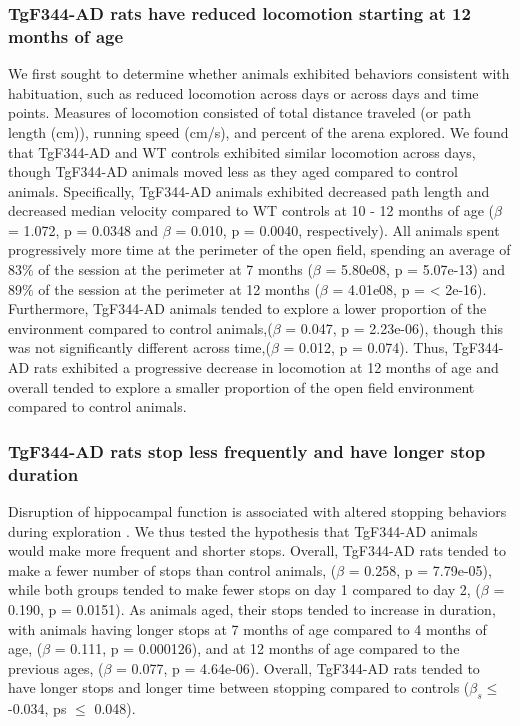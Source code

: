 \documentclass[fleqn,10pt]{wlscirep}
\begin{document}
\subsubsection*{TgF344-AD rats have reduced locomotion starting at 12 months of age}
We first sought to determine whether animals exhibited behaviors consistent with habituation, such as reduced locomotion across days or across days and time points. Measures of locomotion consisted of total distance traveled (or path length (cm)), running speed (cm/s), and percent of the arena explored. We found that TgF344-AD and WT controls exhibited similar locomotion across days, though TgF344-AD animals moved less as they aged compared to control animals. Specifically, TgF344-AD animals exhibited decreased path length and decreased median velocity compared to WT controls at 10 - 12 months of age ($\beta$ = 1.072, p =  0.0348 and $\beta$ = 0.010, p = 0.0040, respectively). All animals spent progressively more time at the perimeter of the open field, spending an average of 83$\%$ of the session at the perimeter at 7 months ($\beta$ = 5.80e08, p = 5.07e-13)  and 89$\%$ of the session at the perimeter at 12 months ($\beta$ = 4.01e08, p = < 2e-16). Furthermore, TgF344-AD animals tended to explore a lower proportion of the environment compared to control animals,($\beta$ = 0.047, p = 2.23e-06), though this was not significantly different across time,($\beta$ = 0.012, p = 0.074). Thus, TgF344-AD rats exhibited a progressive decrease in locomotion at 12 months of age and overall tended to explore a smaller proportion of the open field environment compared to control animals. 

\subsubsection*{TgF344-AD rats stop less frequently and have longer stop duration}   
Disruption of hippocampal function is associated with altered stopping behaviors during exploration \cite{martin_medial_2007}. We thus tested the hypothesis that TgF344-AD animals would make more frequent and shorter stops. Overall, TgF344-AD rats tended to make a fewer number of stops than control animals, ($\beta$ = 0.258, p = 7.79e-05), while both groups tended to make fewer stops on day 1 compared to day 2, ($\beta$ = 0.190, p = 0.0151). As animals aged, their stops tended to increase in duration, with animals having longer stops at 7 months of age compared to 4 months of age, ($\beta$ = 0.111, p = 0.000126), and at 12 months of age compared to the previous ages, ($\beta$ = 0.077, p = 4.64e-06). Overall, TgF344-AD rats tended to have longer stops and longer time between stopping compared to controls ($\beta_s \leq$ -0.034, ps $\leq$ 0.048).
\end{document}
